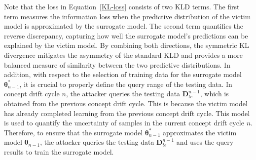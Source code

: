 Note that the loss in Equation~\ref{KL-loss} consists of two KLD terms. 
The first term measures the information loss when the predictive distribution of the victim model is approximated by the surrogate model. 
The second term quantifies the reverse discrepancy, capturing how well the surrogate model’s predictions can be explained by the victim model. 
By combining both directions, the symmetric KL divergence mitigates the asymmetry of the standard KLD and provides a more balanced measure of similarity between the two predictive distributions.
In addition, with respect to the selection of training data for the surrogate model $\bm{\theta}_{n-1}^{*}$, it is crucial to properly define the query range of the testing data.
In concept drift cycle $n$, the attacker queries the testing data $\bm{D}_{te}^{n-1}$, which is obtained from the previous concept drift cycle.
This is because the victim model has already completed learning from the previous concept drift cycle.
This model is used to quantify the uncertainty of samples in the current concept drift cycle $n$.
Therefore, to ensure that the surrogate model $\bm{\theta}_{n-1}^{*}$ approximates the victim model $\bm{\theta}_{n-1}$, the attacker queries the testing data $\bm{D}_{te}^{n-1}$ and uses the query results to train the surrogate model.


